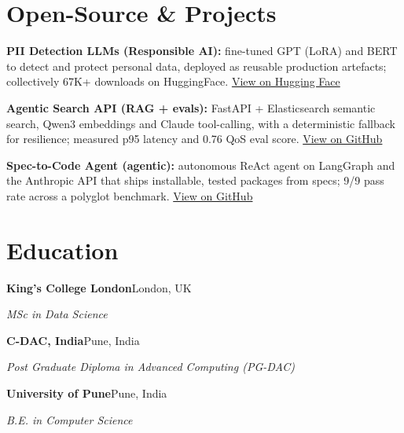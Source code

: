 \documentclass[10pt,a4paper]{article}
\begin{document}
\section{Open-Source \& Projects}
\begin{tight}
  \item \textbf{PII Detection LLMs (Responsible AI):} fine-tuned GPT (LoRA) and BERT to detect and protect personal data, deployed as reusable production artefacts; collectively 67K+ downloads on HuggingFace. \href{https://huggingface.co/ab-ai/pii_model}{View on Hugging Face}
  \item \textbf{Agentic Search API (RAG + evals):} FastAPI + Elasticsearch semantic search, Qwen3 embeddings and Claude tool-calling, with a deterministic fallback for resilience; measured p95 latency and 0.76 QoS eval score. \href{https://github.com/abhijeetscode/search-agent}{View on GitHub}
  \item \textbf{Spec-to-Code Agent (agentic):} autonomous ReAct agent on LangGraph and the Anthropic API that ships installable, tested packages from specs; 9/9 pass rate across a polyglot benchmark. \href{https://github.com/abhijeetscode/Spec-to-Code-Agent}{View on GitHub}
\end{tight}

\section{Education}
{\color{company}\bfseries King's College London}\hfill {\color{muted}London, UK}\par
{\itshape MSc in Data Science}\par\vspace{2pt}
{\color{company}\bfseries C-DAC, India}\hfill {\color{muted}Pune, India}\par
{\itshape Post Graduate Diploma in Advanced Computing (PG-DAC)}\par\vspace{2pt}
{\color{company}\bfseries University of Pune}\hfill {\color{muted}Pune, India}\par
{\itshape B.E. in Computer Science}\par
\end{document}

